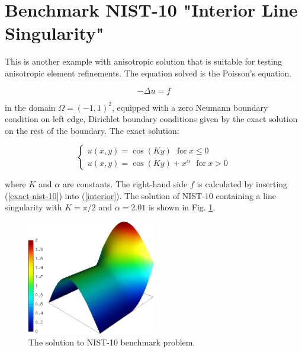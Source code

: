 \section{Benchmark NIST-10 "Interior Line Singularity"}
\label{sec:bench-10}

This is another example with anisotropic solution that is suitable for testing
anisotropic element refinements. The equation solved is the Poisson's equation.

\begin{equation} \label{interior}
-\Delta u = f 
\end{equation}

in the domain $\Omega = (-1, 1)^2$, equipped with a zero
Neumann boundary condition on left edge, Dirichlet boundary
conditions given by the exact solution on the rest of the boundary.
The exact solution:

\begin{equation}\label{exact-nist-10}
\left\{
\begin{array}{l}
\displaystyle
u(x,y) = \cos(Ky)\ \ \ \mbox{for}\ x \le 0 \\
u(x,y) = \cos(Ky) + x^{\alpha}\ \ \ \mbox{for}\ x > 0 
\end{array}
\right.
\end{equation}

where $K$ and $\alpha$ are constants.
The right-hand side $f$ is calculated by inserting
(\ref{exact-nist-10}) into (\ref{interior}).
The solution of NIST-10 containing a line singularity with $K = \pi/2$ and
$\alpha = 2.01$ is shown in Fig. \ref{fig:sln-nist10}.

\begin{figure}[!ht]
\centering
\includegraphics[height=5cm]{nist/nist-10/solution.png}
\caption{The solution to NIST-10 benchmark problem.}
\label{fig:sln-nist10}
\end{figure}


